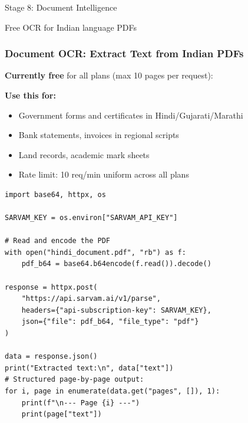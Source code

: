 \begin{frame}[fragile]\frametitle{}
\begin{center}
{\Large Stage 8: Document Intelligence}

{\normalsize Free OCR for Indian language PDFs}
\end{center}
\end{frame}

\begin{frame}[fragile]\frametitle{Document OCR: Extract Text from Indian PDFs}
\textbf{Currently free} for all plans (max 10 pages per request):

\textbf{Use this for:}
  \begin{itemize}
    \item Government forms and certificates in Hindi/Gujarati/Marathi
    \item Bank statements, invoices in regional scripts
    \item Land records, academic mark sheets
    \item Rate limit: 10 req/min uniform across all plans
  \end{itemize}
\begin{lstlisting}
import base64, httpx, os

SARVAM_KEY = os.environ["SARVAM_API_KEY"]

# Read and encode the PDF
with open("hindi_document.pdf", "rb") as f:
    pdf_b64 = base64.b64encode(f.read()).decode()

response = httpx.post(
    "https://api.sarvam.ai/v1/parse",
    headers={"api-subscription-key": SARVAM_KEY},
    json={"file": pdf_b64, "file_type": "pdf"}
)

data = response.json()
print("Extracted text:\n", data["text"])
# Structured page-by-page output:
for i, page in enumerate(data.get("pages", []), 1):
    print(f"\n--- Page {i} ---")
    print(page["text"])
\end{lstlisting}
\end{frame}

